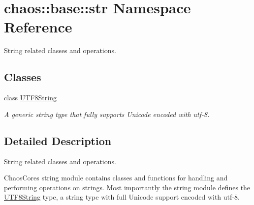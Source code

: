 \hypertarget{namespacechaos_1_1base_1_1str}{}\section{chaos\+:\+:base\+:\+:str Namespace Reference}
\label{namespacechaos_1_1base_1_1str}


String related classes and operations.  


\subsection*{Classes}
\begin{DoxyCompactItemize}
\item 
class \hyperlink{classchaos_1_1base_1_1str_1_1_u_t_f8_string}{U\+T\+F8\+String}
\begin{DoxyCompactList}\small\item\em A generic string type that fully supports Unicode encoded with utf-\/8. \end{DoxyCompactList}\end{DoxyCompactItemize}


\subsection{Detailed Description}
String related classes and operations. 

Chaos\+Core\textquotesingle{}s string module contains classes and functions for handling and performing operations on strings. Most importantly the string module defines the \hyperlink{classchaos_1_1base_1_1str_1_1_u_t_f8_string}{U\+T\+F8\+String} type, a string type with full Unicode support encoded with utf-\/8. 